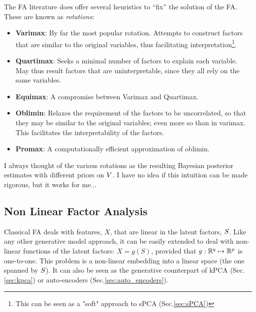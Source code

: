 \documentclass[12pt,a4paper]{article}
\begin{document}
The FA literature does offer several heuristics to ``fix'' the solution of the FA. 
These are known as \emph{rotations}:
\begin{itemize}
	\item \textbf{Varimax}: 
	By far the most popular rotation. Attempts to construct factors that are similar to the original variables, thus facilitating interpretation\footnote{This can be seen as a "soft" approach to sPCA (Sec.\ref{sec:sPCA})}.
	
	\item \textbf{Quartimax}: 
	Seeks a minimal number of factors to explain each variable. 
	May thus result factors that are uninterpretable, since they all rely on the same variables.
	
	\item \textbf{Equimax}: A compromise between Varimax and Quartimax. 
	
	\item \textbf{Oblimin}: 
	Relaxes the requirement of the factors to be uncorrelated, so that they may be similar to the original variables; even more so than in varimax. 
	This facilitates the interpretability of the factors. 
	
	\item \textbf{Promax}: 
	A computationally efficient approximation of oblimin.
\end{itemize}

\begin{remark}
	I always thought of the various rotations as the resulting Bayesian posterior estimates with different priors on $V$. 
	I have no idea if this intuition can be made rigorous, but it works for me...
\end{remark}




\subsection{Non Linear Factor Analysis}
Classical FA deals with features, $X$, that are linear in the latent factors, $S$. 
Like any other generative model approach, it can be easily extended to deal with non-linear functions of the latent factors: $X=g(S)$, provided that $g:\mathbb{R}^q \mapsto \mathbb{R}^p$ is one-to-one. 
This problem is a non-linear embedding into a linear space (the one spanned by $S$).
It can also be seen as the generative counterpart of kPCA (Sec.\ref{sec:kpca}) or auto-encoders (Sec.\ref{sec:auto_encoders}).
\end{document}
